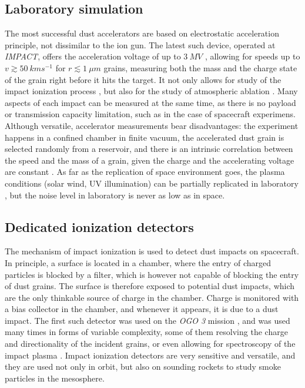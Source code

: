 \subsection{Laboratory simulation}

The most successful dust accelerators are based on electrostatic acceleration principle, not dissimilar to the ion gun. The latest such device, operated at \textit{IMPACT}, offers the acceleration voltage of up to $\SI{3}{MV}$ \citep{shu20123}, allowing for speeds up to $v\gtrsim \SI{50}{kms^{-1}}$ for $r\lesssim\SI{1}{\mu m}$ grains, measuring both the mass and the charge state of the grain right before it hits the target. It not only allows for study of the impact ionization process \citep{shen2021electrostatic,shen2023variability,nouzak2018laboratory,nouzak2021detection,kovcivsvcak2020effective,collette2014micrometeoroid}, but also for the study of atmospheric ablation \citep{thomas2017experimental,deluca2018ionization,deluca2022differential,tarnecki2023experimentally}. Many aspects of each impact can be measured at the same time, as there is no payload or transmission capacity limitation, such as in the case of spacecraft experimens. Although versatile, accelerator measurements bear disadvantages: the experiment happens in a confined chamber in finite vacuum, the accelerated dust grain is selected randomly from a reservoir, and there is an intrinsic correlation between the speed and the mass of a grain, given the charge and the accelerating voltage are constant \citep{shelton1960electrostatic}. As far as the replication of space environment goes, the plasma conditions (solar wind, UV illumination) can be partially replicated in laboratory \citep{shu20123,horanyi2008surface}, but the noise level in laboratory is never as low as in space. 

\subsection{Dedicated ionization detectors}

The mechanism of impact ionization is used to detect dust impacts on spacecraft. In principle, a surface is located in a chamber, where the entry of charged particles is blocked by a filter, which is however not capable of blocking the entry of dust grains.  The surface is therefore exposed to potential dust impacts, which are the only thinkable source of charge in the chamber. Charge is monitored with a bias collector in the chamber, and whenever it appears, it is due to a dust impact. The first such detector was used on the \textit{OGO 3} mission \citep{alexander1968zodiacal}, and was used many times in forms of variable complexity, some of them resolving the charge and directionality \citep{grun1992galileo,grun1992ulysses,berg1969pioneer} of the incident grains, or even allowing for spectroscopy of the impact plasma \citep{srama2004cassini,sommer2023measuring}. Impact ionization detectors are very sensitive and versatile, and they are used not only in orbit, but also on sounding rockets \citep{gunnarsdottir2019charging,trollvik2019observation} to study smoke particles in the mesosphere. 

